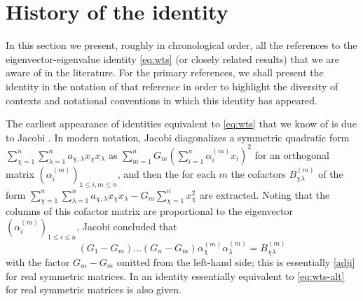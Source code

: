 \documentclass[12pt]{amsart}
\begin{document}
\section{History of the identity}\label{history-sec}

In this section we present, roughly in chronological order, all the references to the eigenvector-eigenvalue identity \eqref{eq:wts} (or closely related results) that we are aware of in the literature.  For the primary references, we shall present the identity in the notation of that reference in order to highlight the diversity of contexts and notational conventions in which this identity has appeared.
 
The earliest appearance of identities equivalent to \eqref{eq:wts} that we know of is due to Jacobi \cite[\S 8, (33)]{jacobi}.  In modern notation, Jacobi diagonalizes a symmetric quadratic form $\sum_{\chi=1}^n \sum_{\lambda=1}^n a_{\chi,\lambda} x_\chi x_\lambda$ as $\sum_{m=1}^n G_m (\sum_{i=1}^n \alpha_i^{(m)} x_i)^2$ for an orthogonal matrix $(\alpha_i^{(m)})_{1 \leq i,m \leq n}$, and then the for each $m$ the cofactors $B^{(m)}_{\chi \lambda}$ of the form $\sum_{\chi=1}^n \sum_{\lambda=1}^n a_{\chi,\lambda} x_\chi x_\lambda - G_m \sum_{\chi=1}^n x_\chi^2$ are extracted.  Noting that the columns of this cofactor matrix are proportional to the eigenvector $(\alpha_i^{(m)})_{1 \leq i \leq n}$, Jacobi concluded that
\begin{equation}\label{denom}
(G_1-G_m) \dots (G_n-G_m) \alpha_\chi^{(m)} \alpha_\lambda^{(m)} = B_{\chi\lambda}^{(m)}
\end{equation}
with the factor $G_m-G_m$ omitted from the left-hand side; this is essentially \eqref{adji} for real symmetric matrices. In \cite[\S 8, (36)]{jacobi} an identity essentially equivalent to \eqref{eq:wts-alt} for real symmetric matrices is also given.
 
\end{document}
